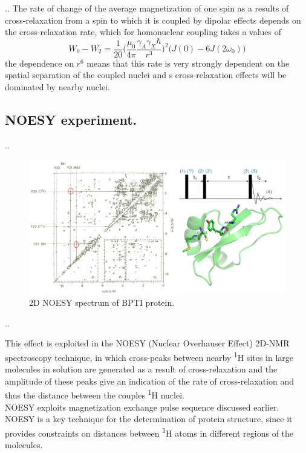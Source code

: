 \documentclass[handout]{beamer}
\begin{document}
\begin{frame}{\thesection.\thesubsection. \insertsubsection}
The rate of change of the average magnetization of one spin as a results of cross-relaxation from a spin to which it is coupled by dipolar effects depends on the cross-relaxation rate, which for homonuclear coupling takes a values of 
  \begin{equation}
    W_0 - W_2 =  \dfrac{1}{20} \Big(  \dfrac{\mu_0}{4 \pi} \dfrac{\gamma_A \gamma_X \hbar}{r^3} \Big)^2 \big( J(0) - 6J(2 \omega_0) \big)
  \end{equation}
  the dependence on $r^6$ means that this rate is very strongly dependent on the spatial separation of the coupled nuclei and s cross-relaxation effects will be dominated by nearby nuclei.
  
\end{frame}

\subsection{NOESY experiment.} 

\begin{frame}{\thesection.\thesubsection. \insertsubsection}
  \begin{figure}
  	  \centering
  	  \includegraphics[scale=0.35]{figures/2D_NOESY_BPTI.png}
  	  \caption{2D NOESY spectrum of BPTI protein.}
  \end{figure}
\end{frame}

\begin{frame}{\thesection.\thesubsection. \insertsubsection}

   This effect is exploited in the\alert{ NOESY (Nuclear Overhauser Effect)} 2D-NMR spectroscopy technique, in which cross-peaks between nearby \textsuperscript{1}H sites in large molecules in solution are generated as a result of cross-relaxation and the amplitude of these peaks give an indication of the rate of cross-relaxation and thus the distance between the couples \textsuperscript{1}H nuclei.  \\
      NOESY exploits magnetization exchange pulse sequence discussed earlier.    \\
  NOESY is a key technique for the determination of protein structure, since it provides constraints on distances between \textsuperscript{1}H atoms in different regions of the molecules.
  
\end{frame}
\end{document}
